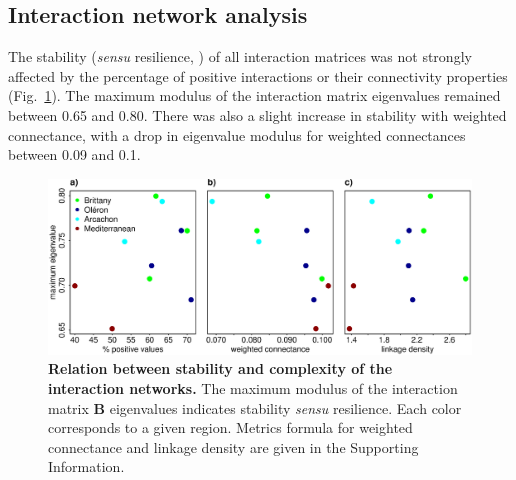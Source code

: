 \documentclass[10pt]{article}
\begin{document}
\subsection*{Interaction network analysis}

The stability (\emph{sensu} resilience, \citealt{ives_stability_2007})
of all interaction matrices was not strongly affected by the percentage
of positive interactions or their connectivity properties (Fig.~\ref{fig:Stability-community}).
The maximum modulus of the interaction matrix eigenvalues remained
between 0.65 and 0.80. There was also a slight increase in stability
with weighted connectance, with a drop in eigenvalue modulus for weighted
connectances between 0.09 and 0.1.

\begin{figure}[!ht]
\centering \includegraphics[width=1\textwidth]{complexity_stability_MainFig_pencenjustB}
\caption{\textbf{Relation between stability and complexity of the interaction
networks.} The maximum modulus of the interaction matrix $\mathbf{B}$
eigenvalues indicates stability \emph{sensu} resilience. Each color corresponds to a given region. Metrics formula for weighted
connectance and linkage density are given in the Supporting Information.}
\label{fig:Stability-community} 
\end{figure}
\end{document}
